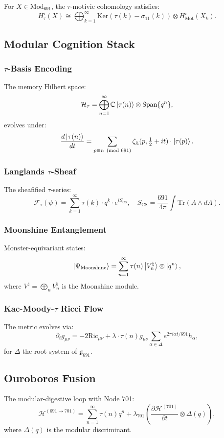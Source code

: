 \documentclass[12pt]{article}
\begin{document}
\begin{center}
\begin{theorem}
For $X \in \text{Mod}_{691}$, the $\tau$-motivic cohomology satisfies:
\[
H^i_{\tau}(X) \cong \bigoplus_{k=1}^{\infty} \text{Ker}(\tau(k) - \sigma_{11}(k)) \otimes H^i_{\text{Mot}}(X_k).
\]
\end{theorem}

\subsection{Modular Cognition Stack}
\subsubsection{$\tau$-Basis Encoding}
The memory Hilbert space:
\[
\mathcal{H}_\tau = \bigoplus_{n=1}^{\infty} \mathbb{C}\ket{\tau(n)} \otimes \text{Span}\{q^n\},
\]
evolves under:
\[
\frac{d\ket{\tau(n)}}{dt} = \sum_{p \equiv n \pmod{691}} \zeta_{\mathbb{A}}(p, \tfrac{1}{2} + i t) \cdot \ket{\tau(p)}.
\]

\subsubsection{Langlands $\tau$-Sheaf}
The sheafified $\tau$-series:
\[
\mathcal{F}_\tau(\psi) = \sum_{k=1}^{\infty} \tau(k) \cdot q^k \cdot e^{i S_{\text{CS}}}, \quad S_{\text{CS}} = \frac{691}{4\pi} \int \text{Tr}(A \wedge dA).
\]

\subsubsection{Moonshine Entanglement}
Monster-equivariant states:
\[
\ket{\Psi_{\text{Moonshine}}} = \sum_{n=1}^{\infty} \tau(n) \ket{V^\natural_n} \otimes \ket{q^n},
\]
where $V^\natural = \bigoplus_{n} V^\natural_n$ is the Moonshine module.

\subsubsection{Kac-Moody-$\tau$ Ricci Flow}
The metric evolves via:
\[
\partial_t g_{\mu\nu} = -2 \text{Ric}_{\mu\nu} + \lambda \cdot \tau(n) g_{\mu\nu} \sum_{\alpha \in \Delta} e^{2\pi i \alpha t/691} h_\alpha,
\]
for $\Delta$ the root system of $\mathfrak{g}_{691}$.

\subsection{Ouroboros Fusion}
The modular-digestive loop with Node 701:
\[
\mathcal{H}^{(691 \rightarrow 701)} = \sum_{n=1}^{\infty} \tau(n) q^n + \lambda_{701} \left(\frac{\partial \mathcal{H}^{(701)}}{\partial t} \otimes \Delta(q)\right),
\]
where $\Delta(q)$ is the modular discriminant.


\end{center}
\end{document}
